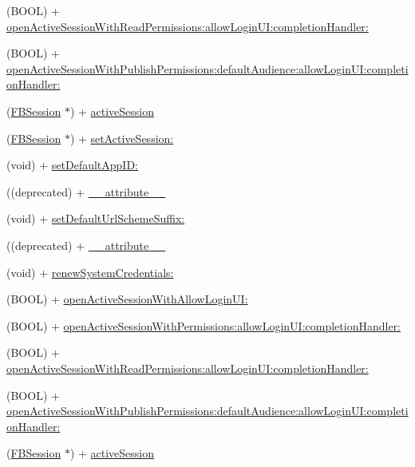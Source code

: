 \begin{DoxyCompactItemize}
\item 
(B\+O\+OL) + \hyperlink{interfaceFBSession_add12d4669d7e770d8fedeab148ca5dd9}{open\+Active\+Session\+With\+Read\+Permissions\+:allow\+Login\+U\+I\+:completion\+Handler\+:}
\item 
(B\+O\+OL) + \hyperlink{interfaceFBSession_a727a1541ad09287fb613a018e100534d}{open\+Active\+Session\+With\+Publish\+Permissions\+:default\+Audience\+:allow\+Login\+U\+I\+:completion\+Handler\+:}
\item 
(\hyperlink{interfaceFBSession}{F\+B\+Session} $\ast$) + \hyperlink{interfaceFBSession_aaf6863ab39e2f67733792453874d3870}{active\+Session}
\item 
(\hyperlink{interfaceFBSession}{F\+B\+Session} $\ast$) + \hyperlink{interfaceFBSession_af1b30bea1e3251f8d75f76b10369756e}{set\+Active\+Session\+:}
\item 
(void) + \hyperlink{interfaceFBSession_afb4f41ffcd4d824a16147cb41b932a32}{set\+Default\+App\+I\+D\+:}
\item 
((deprecated) + \hyperlink{interfaceFBSession_aab7b90337909b905920a4067b5253c2b}{\+\_\+\+\_\+attribute\+\_\+\+\_\+}
\item 
(void) + \hyperlink{interfaceFBSession_ac3d4f0df3cae8fe5091b9d98b9f166d4}{set\+Default\+Url\+Scheme\+Suffix\+:}
\item 
((deprecated) + \hyperlink{interfaceFBSession_aab7b90337909b905920a4067b5253c2b}{\+\_\+\+\_\+attribute\+\_\+\+\_\+}
\item 
(void) + \hyperlink{interfaceFBSession_a3b4d7c16af36ea5690d19bf77065dfaf}{renew\+System\+Credentials\+:}
\item 
(B\+O\+OL) + \hyperlink{interfaceFBSession_abe6b20f6e3202521b7ecb4115c8e865d}{open\+Active\+Session\+With\+Allow\+Login\+U\+I\+:}
\item 
(B\+O\+OL) + \hyperlink{interfaceFBSession_ac90957d41f538f96b5d8c9087ad3ad2d}{open\+Active\+Session\+With\+Permissions\+:allow\+Login\+U\+I\+:completion\+Handler\+:}
\item 
(B\+O\+OL) + \hyperlink{interfaceFBSession_add12d4669d7e770d8fedeab148ca5dd9}{open\+Active\+Session\+With\+Read\+Permissions\+:allow\+Login\+U\+I\+:completion\+Handler\+:}
\item 
(B\+O\+OL) + \hyperlink{interfaceFBSession_a727a1541ad09287fb613a018e100534d}{open\+Active\+Session\+With\+Publish\+Permissions\+:default\+Audience\+:allow\+Login\+U\+I\+:completion\+Handler\+:}
\item 
(\hyperlink{interfaceFBSession}{F\+B\+Session} $\ast$) + \hyperlink{interfaceFBSession_aaf6863ab39e2f67733792453874d3870}{active\+Session}

\end{DoxyCompactItemize}
